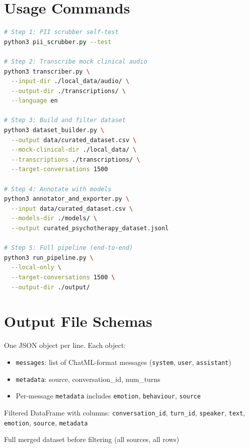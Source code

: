 \documentclass[11pt,a4paper]{article}
\begin{document}
\section{Usage Commands}

\begin{tcolorbox}[colback=darkbg!5, colframe=teal, title=CLI Commands, fonttitle=\sffamily\bfseries]
\begin{lstlisting}[language=bash, caption=Pipeline execution commands, basicstyle=\ttfamily\footnotesize]
# Step 1: PII scrubber self-test
python3 pii_scrubber.py --test

# Step 2: Transcribe mock clinical audio
python3 transcriber.py \
  --input-dir ./local_data/audio/ \
  --output-dir ./transcriptions/ \
  --language en

# Step 3: Build and filter dataset
python3 dataset_builder.py \
  --output data/curated_dataset.csv \
  --mock-clinical-dir ./local_data/ \
  --transcriptions ./transcriptions/ \
  --target-conversations 1500

# Step 4: Annotate with models
python3 annotator_and_exporter.py \
  --input data/curated_dataset.csv \
  --models-dir ./models/ \
  --output curated_psychotherapy_dataset.jsonl

# Step 5: Full pipeline (end-to-end)
python3 run_pipeline.py \
  --local-only \
  --target-conversations 1500 \
  --output-dir ./output/
\end{lstlisting}
\end{tcolorbox}

\section{Output File Schemas}

\begin{tcolorbox}[colback=lightgray!30, colframe=teal, title=Final Output Schema, fonttitle=\sffamily\bfseries]
\begin{description}[style=nextline]
\item[curated\_psychotherapy\_dataset.jsonl] One JSON object per line. Each object:
\begin{itemize}
\item \texttt{messages}: list of ChatML-format messages (\texttt{system}, \texttt{user}, \texttt{assistant})
\item \texttt{metadata}: source, conversation\_id, num\_turns
\item Per-message \texttt{metadata} includes \texttt{emotion}, \texttt{behaviour}, \texttt{source}
\end{itemize}
\item[curated\_dataset.csv] Filtered DataFrame with columns: \texttt{conversation\_id}, \texttt{turn\_id}, \texttt{speaker}, \texttt{text}, \texttt{emotion}, \texttt{source}, \texttt{metadata}
\item[curated\_dataset\_merged.csv] Full merged dataset before filtering (all sources, all rows)
\end{description}
\end{tcolorbox}
\end{document}
